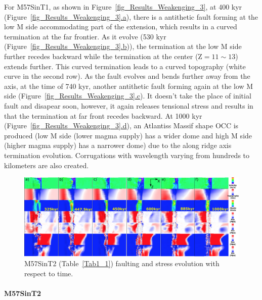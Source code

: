 For M57SinT1, as shown in Figure~\hyperref[fig_Results_Weakenging_3]{\ref{fig_Results_Weakenging_3}}, at 400 kyr (Figure~\hyperref[fig_Results_Weakenging_3]{\ref{fig_Results_Weakenging_3}.a}), there is a antithetic fault forming at the low M side accommodating part of the extension, which results in a curved termination at the far frontier. As it evolve (530 kyr (Figure~\hyperref[fig_Results_Weakenging_3]{\ref{fig_Results_Weakenging_3}.b})), the termination at the low M side further recedes backward while the termination at the center (Z$=11\sim13$) extends further. This curved termination leads to a curved topography (white curve in the second row). As the fault evolves and bends further away from the axis, at the time of 740 kyr, another antithetic fault forming again at the low M side (Figure~\hyperref[fig_Results_Weakenging_3]{\ref{fig_Results_Weakenging_3}.c}). It doesn't take the place of initial fault and disapear soon, however, it again releases tensional stress and results in that the termination at far front recedes backward. At 1000 kyr (Figure~\hyperref[fig_Results_Weakenging_3]{\ref{fig_Results_Weakenging_3}.d}), an Atlantiss Massif shape OCC is produced (low M side (lower magma supply) has a wider dome and high M side (higher magma supply) has a narrower dome) due to the along ridge axis termination evolution. Corrugations with wavelength varying from hundreds to kilometers are also created.       

\begin{figure}[h]
 \centering
  \includegraphics[width=1.0\textwidth]{./Figures/fig_Results_Weakening_4_M57SinT2_time_evolution.eps}
 \caption{M57SinT2 (Table~\hyperref[Tab1_1]{\ref{Tab1_1}}) faulting and stress evolution with respect to time.}
\label{fig_Results_Weakenging_4}
\end{figure}

\paragraph{M57SinT2}\label{para_M57SinT2}

